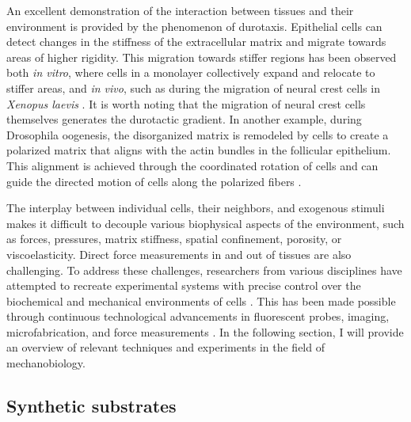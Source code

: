 An excellent demonstration of the interaction between tissues and their environment is provided by the phenomenon of durotaxis. Epithelial cells can detect changes in the stiffness of the extracellular matrix and migrate towards areas of higher rigidity. This migration towards stiffer regions has been observed both \textit{in vitro}, where cells in a monolayer collectively expand and relocate to stiffer areas, and \textit{in vivo}, such as during the migration of neural crest cells in \textit{Xenopus laevis} \cite{sunyer2016, shellard2021}. It is worth noting that the migration of neural crest cells themselves generates the durotactic gradient. In another example, during Drosophila oogenesis, the disorganized matrix is remodeled by cells to create a polarized matrix that aligns with the actin bundles in the follicular epithelium. This alignment is achieved through the coordinated rotation of cells and can guide the directed motion of cells along the polarized fibers \cite{haigo2011, cetera2014}.

The interplay between individual cells, their neighbors, and exogenous stimuli makes it difficult to decouple various biophysical aspects of the environment, such as forces, pressures, matrix stiffness, spatial confinement, porosity, or viscoelasticity. Direct force measurements in and out of tissues are also challenging. To address these challenges, researchers from various disciplines have attempted to recreate experimental systems with precise control over the biochemical and mechanical environments of cells \cite{xi2018}. This has been made possible through continuous technological advancements in fluorescent probes, imaging, microfabrication, and force measurements \cite{roca-cusachs2017}. In the following section, I will provide an overview of relevant techniques and experiments in the field of mechanobiology.

\hypertarget{synthetic-substrates}{%
\subsection{Synthetic substrates}\label{synthetic-substrates}}

